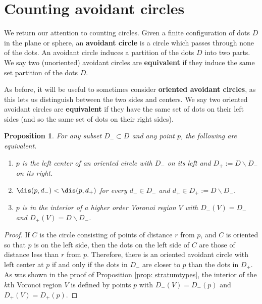 \documentclass[11pt,oneside]{amsart}
\newtheorem{prop}[thm]{Proposition}
\theoremstyle{definition}
\theoremstyle{remark}
\numberwithin{equation}{section}
\begin{document}
\section{Counting avoidant circles}

We return our attention to counting circles. Given a finite configuration of dots $D$ in the plane or sphere, an \textbf{avoidant circle} is a circle which passes through none of the dots. An avoidant circle induces a partition of the dots $D$ into two parts. 
We say two (unoriented) avoidant circles are \textbf{equivalent} if they induce the same set partition of the dots $D$.

As before, it will be useful to sometimes consider \textbf{oriented avoidant circles}, as this lets us distinguish between the two sides and centers. We say two oriented avoidant circles are \textbf{equivalent} if they have the same set of dots on their left sides (and so the same set of dots on their right sides).




\begin{prop}\label{prop: Voronoivertex}
For any subset $D_-\subset D$ and any point $p$, the following are equivalent.
\begin{enumerate}
    \item $p$ is the left center of an oriented circle with $D_-$ on its left and $D_+:=D\smallsetminus D_-$ on its right.
    \item $\dis(p,d_-) < \dis(p,d_+) $ for every $d_-\in D_-$ and $d_+\in D_+:=D\smallsetminus D_-$.
    \item $p$ is in the interior of a higher order Voronoi region $V$ with $D_-(V)=D_-$ and $D_+(V) = D\smallsetminus D_-$.
\end{enumerate}
\end{prop}

\begin{proof}
If $C$ is the circle consisting of points of distance $r$ from $p$, and $C$ is oriented so that $p$ is on the left side, then the dots on the left side of $C$ are those of distance less than $r$ from $p$. Therefore, there is an oriented avoidant circle with left center at $p$ if and only if the dots in $D_-$ are closer to $p$ than the dots in $D_+$. As was shown in the proof of Proposition \ref{prop: stratumtypes}, the interior of the $k$th Voronoi region $V$ is defined by points $p$ with $D_-(V)=D_-(p)$ and $D_+(V)=D_+(p)$.
\end{proof}
\end{document}

